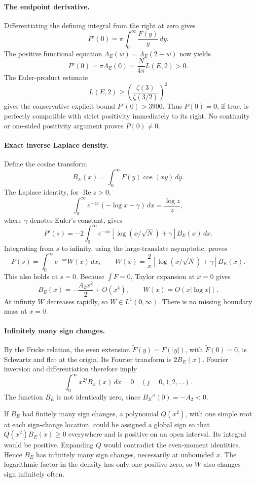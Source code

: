 \documentclass[11pt]{article}
\begin{document}
\paragraph{The endpoint derivative.}
Differentiating the defining integral from the right at zero gives
\[
 P'(0)=\pi\int_0^\infty\frac{F(y)}y\,dy.
\]
The positive functional equation
\(\Lambda_E(w)=\Lambda_E(2-w)\) now yields
\[
 \boxed{\displaystyle
 P'(0)=\pi\Lambda_E(0)
       =\frac{N}{4\pi}L(E,2)>0.}
\]
The Euler-product estimate
\[
 L(E,2)\ge
 \left(\frac{\zeta(3)}{\zeta(3/2)}\right)^2
\]
gives the conservative explicit bound \(P'(0)>3900\).
Thus \(P(0)=0\), if true, is perfectly compatible with
strict positivity immediately to its right. No continuity
or one-sided positivity argument proves \(P(0)\ne0\).

\paragraph{Exact inverse Laplace density.}
Define the cosine transform
\[
 B_E(x)=\int_0^\infty F(y)\cos(xy)\,dy.
\]
The Laplace identity, for \(\operatorname{Re}z>0\),
\[
 \int_0^\infty e^{-zx}(-\log x-\gamma)\,dx
       =\frac{\log z}{z},
\]
where \(\gamma\) denotes Euler's constant, gives
\[
 P'(s)=-2\int_0^\infty e^{-sx}
       [\log(x/\sqrt N)+\gamma]B_E(x)\,dx.
\]
Integrating from \(s\) to infinity, using the large-translate asymptotic, proves
\[
 \boxed{\displaystyle
 P(s)=\int_0^\infty e^{-sx}W(x)\,dx,\qquad
 W(x)=\frac{2}{x}
       [\log(x/\sqrt N)+\gamma]B_E(x).}
\]
This also holds at \(s=0\). Because
\(\int F=0\), Taylor expansion at \(x=0\) gives
\[
 B_E(x)=-\frac{A_2x^2}{2}+O(x^4),
 \qquad W(x)=O(x|\log x|).
\]
At infinity \(W\) decreases rapidly, so \(W\in L^1(0,\infty)\).
There is no missing boundary mass at \(x=0\).

\paragraph{Infinitely many sign changes.}
By the Fricke relation, the even extension
\(\widetilde F(y)=F(|y|)\), with
\(\widetilde F(0)=0\), is Schwartz and flat at the origin.
Its Fourier transform is \(2B_E(x)\).
Fourier inversion and differentiation therefore imply
\[
 \boxed{\displaystyle
 \int_0^\infty x^{2j}B_E(x)\,dx=0
 \quad(j=0,1,2,\ldots).}
\]
The function \(B_E\) is not identically zero, since
\(B_E''(0)=-A_2<0\).

If \(B_E\) had finitely many sign changes, a polynomial
\(Q(x^2)\), with one simple root at each sign-change
location, could be assigned a global sign so that
\(Q(x^2)B_E(x)\ge0\) everywhere and is positive on an
open interval. Its integral would be positive. Expanding
\(Q\) would contradict the even-moment identities. Hence \(B_E\) has infinitely
many sign changes, necessarily at unbounded \(x\).
The logarithmic factor in the density has only one positive zero,
so \(W\) also changes sign infinitely often.
\end{document}
